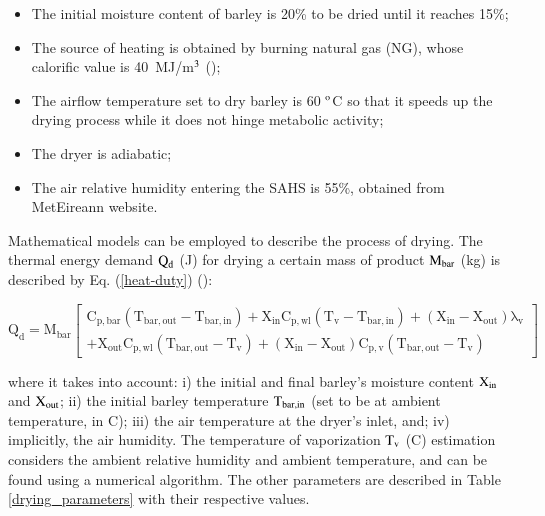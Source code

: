 \begin{itemize}
	\item The initial moisture content of barley is 20\% to be dried until it reaches 15\%;
	\item The source of heating is obtained by burning natural gas (NG), whose calorific value is 40~MJ/m$^{\rm{3}}$ (\cite{GOVUK2022});
	\item The airflow temperature set to dry barley is 60 $^{\rm{o}}$C so that it speeds up the drying process while it does not hinge metabolic activity;
	\item The dryer is adiabatic;
	\item The air relative humidity entering the SAHS is 55\%, obtained from MetEireann website. 
\end{itemize}

Mathematical models can be employed to describe the process of drying. The thermal energy demand $\rm{Q_{d}}$ (J) for drying a certain mass of product $\rm{M_{bar}}$ (kg) is described by Eq. (\ref{heat-duty}) (\cite{McCabe1993}):

\vspace{-0.75cm}
\begin{equation}
	\mathrm{Q_{d} = M_{bar}}\left[
	\begin{array}{l} 
		\mathrm{C_{p,bar}(T_{bar,out} - T_{bar,in}) + X_{in}C_{p,wl}(T_v - T_{bar,in}) + (X_{in} - X_{out})\lambda_v } \\
		\mathrm{+ X_{out}C_{p,wl}(T_{bar,out} - T_v) + (X_{in} - X_{out})C_{p,v}(T_{bar,out} - T_v)   }
	\end{array} \right]
	\label{heat-duty}
\end{equation}

\noindent where it takes into account: i) the initial and final barley's moisture content $\rm{X_{in}}$ and $\rm{X_{out}}$; ii) the initial barley temperature $\rm{T_{bar,in}}$ (set to be at ambient temperature, in \textdegree C); iii) the air temperature at the dryer's inlet, and; iv) implicitly, the air humidity. The temperature of vaporization $\rm{T_v}$ (\textdegree C) estimation considers the ambient relative humidity and ambient temperature, and can be found using a numerical algorithm. The other parameters are described in Table \ref{drying_parameters} with their respective values.

